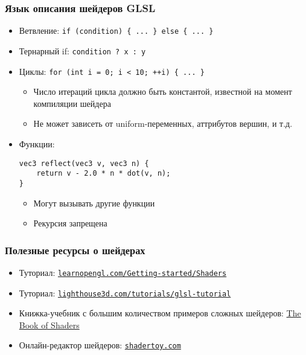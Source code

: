 \documentclass{beamer}
\begin{document}
\begin{frame}[fragile]
\frametitle{Язык описания шейдеров GLSL}
\begin{itemize}
\item Ветвление: \verb|if (condition) { ... } else { ... }|
\pause
\item Тернарный if: \verb|condition ? x : y|
\pause
\item Циклы: \verb|for (int i = 0; i < 10; ++i) { ... }|
\begin{itemize}
\item Число итераций цикла должно быть константой, известной на момент компиляции шейдера
\item {\color{red}Не может зависеть} от uniform-переменных, аттрибутов вершин, и т.д.
\end{itemize}
\pause
\item Функции: \begin{verbatim}vec3 reflect(vec3 v, vec3 n) {
    return v - 2.0 * n * dot(v, n);
}\end{verbatim}
\pause
\begin{itemize}
\item Могут вызывать другие функции
\pause
\item Рекурсия {\color{red}запрещена}
\end{itemize}
\end{itemize}
\end{frame}

\begin{frame}[fragile]
\frametitle{Полезные ресурсы о шейдерах}
\begin{itemize}
\item Туториал: \href{https://learnopengl.com/Getting-started/Shaders}{\nolinkurl{learnopengl.com/Getting-started/Shaders}}
\item Туториал: \href{https://www.lighthouse3d.com/tutorials/glsl-tutorial}{\nolinkurl{lighthouse3d.com/tutorials/glsl-tutorial}}
\pause
\item Книжка-учебник с большим количеством примеров сложных шейдеров: \href{https://thebookofshaders.com/00/}{The Book of Shaders}
\pause
\item Онлайн-редактор шейдеров: \href{https://shadertoy.com/}{\nolinkurl{shadertoy.com}}
\end{itemize}
\end{frame}
\end{document}
